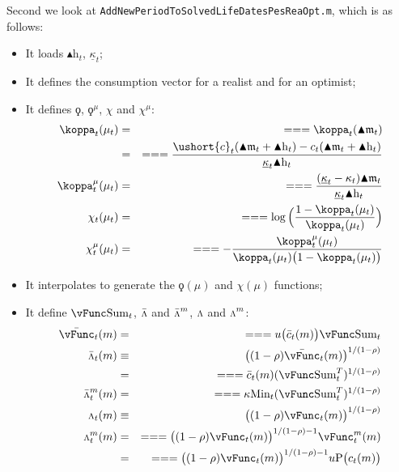 \documentclass[titlepage,abstract]{\econtex}
\providecommand{\kappaMin}{\kappa\text{Min}}
\providecommand{\vSum}{\vFunc\text{Sum}}
\providecommand{\Deltah}{\blacktriangle \mathrm{h}}
\providecommand{\Deltam}{\blacktriangle \mathfrak{m}}
\providecommand{\vInv}{\ensuremath{\scriptstyle \Lambda \displaystyle}}
\begin{document}
Second we look at \texttt{AddNewPeriodToSolvedLifeDatesPesReaOpt.m}, which is as follows:
        \begin{itemize}
        \item It loads $\Deltah_{t}$, $\underline{\kappa}_{t}$;
        \item It defines the consumption vector for a realist and for an optimist;
        \item It defines $\ensuremath{\koppa}$, $\ensuremath{\koppa}^{\mu}$, $\chi$ and $\chi^{\mu}$:
            \begin{equation}\begin{gathered}\begin{aligned}
            \koppa_{t} (\mu_{t})    &=& =  =  =  \koppa_{t} (\Deltam_{t}) \\
               &=& =  =  =  \frac{\ushort{c}_{t}(\Deltam_{t} + \Deltah_{t})-c_{t}(\Deltam_{t} + \Deltah _{t})}{\underline{\kappa}_{t} \Deltah_{t}} \\
            \koppa_{t}^{\mu} (\mu_{t})    &=& =  =  =  \frac{(\underline{\kappa}_{t}-\kappa_{t}) \Deltam_{t}}{\underline{\kappa}_{t} \Deltah_{t}} \\
            \chi_{t} (\mu_{t})    &=& =  =  =  \log\Big(\frac{1-\koppa_{t} (\mu_{t})}{\koppa_{t} (\mu_{t}) }\Big) \\
            \chi_{t}^{\mu} (\mu_{t})    &=& =  =  =  -\frac{\koppa_{t}^{\mu}(\mu_{t})}{\koppa_{t} (\mu_{t})\big(1-\koppa_{t} (\mu_{t})\big)}
            \end{aligned}\end{gathered}\end{equation}
        \item It interpolates to generate the $\ensuremath{\koppa}(\mu)$ and $\chi(\mu)$ functions;
        \item It define $\vSum_{t}$, $\bar{\vInv}$ and $\bar{\vInv}^{m}$, $\vInv$ and $\vInv^{m}$:
            \begin{equation}\begin{gathered}\begin{aligned}
            \bar{\vFunc}_{t} (m)    &=& =  =  =  u\big(\bar{c}_{t}(m)\big) \vSum_{t} \\
            \bar{\vInv}_{t} (m) &\equiv&
            \big((1-\rho)\bar{\vFunc}_{t} (m)\big)^{1/(1-\rho)} \\
               &=& =  =  = \bar{c}_{t}(m) (\vSum_{t}^{T})^{1/(1-\rho)} \\
            \bar{\vInv}_{t}^{m} (m)    &=& =  =  = 
            \kappaMin_{t} (\vSum_{t}^{T})^{1/(1-\rho)} \\
            \vInv_{t} (m) &\equiv&
            \big((1-\rho)\vFunc_{t} (m)\big)^{1/(1-\rho)} \\
            \vInv_{t}^{m} (m)    &=& =  =  = 
            \big((1-\rho)\vFunc_{t} (m)\big)^{1/(1-\rho)-1} \vFunc_{t}^{m} (m)\\
               &=& =  =  = 
            \big((1-\rho)\vFunc_{t} (m)\big)^{1/(1-\rho)-1} u\text{P}\big(c_{t}(m)\big) \\
            \end{aligned}\end{gathered}\end{equation}


\end{itemize}
\end{document}

